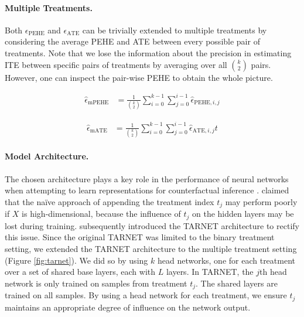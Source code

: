 \documentclass{article}
\begin{document}
\paragraph{Multiple Treatments.} Both $\epsilon_\text{PEHE}$ and $\epsilon_\text{ATE}$ can be trivially extended to multiple treatments by considering the average PEHE and ATE between every possible pair of treatments. Note that we lose the information about the precision in estimating ITE between specific pairs of treatments by averaging over all ${k \choose 2}$ pairs. However, one can inspect the pair-wise PEHE to obtain the whole picture.
\noindent\begin{minipage}{.5\linewidth}
\begin{small}
\begin{align}
\label{eq:multi_PEHE} \hat\epsilon_\text{mPEHE} &= \frac{1}{{k \choose 2}}\sum_{i=0}^{k-1}\sum_{j=0}^{i-1} \hat\epsilon_{\text{PEHE},i,j}
\end{align}
\end{small}
\end{minipage}%
\begin{minipage}{.5\linewidth}
\begin{small}
\begin{align}
\label{eq:multi_ATE} \hat\epsilon_\text{mATE} &= \frac{1}{{k \choose 2}}\sum_{i=0}^{k-1}\sum_{j=0}^{i-1} \hat\epsilon_{\text{ATE},i,j}t
\end{align}
\end{small}
\end{minipage}


\paragraph{Model Architecture.} The chosen architecture plays a key role in the performance of neural networks when attempting to learn representations for counterfactual inference \cite{shalit2016estimating,alaa2018limits}. \citet{shalit2016estimating} claimed that the na\"ive approach of appending the treatment index $t_j$ may perform poorly if $X$ is high-dimensional, because the influence of $t_j$ on the hidden layers may be lost during training. \citet{shalit2016estimating} subsequently introduced the TARNET architecture to rectify this issue. Since the original TARNET was limited to the binary treatment setting, we extended the TARNET architecture to the multiple treatment setting (Figure \ref{fig:tarnet}). We did so by using $k$ head networks, one for each treatment over a set of shared base layers, each with $L$ layers. In TARNET, the $j$th head network is only trained on samples from treatment $t_j$. The shared layers are trained on all samples. By using a head network for each treatment, we ensure $t_j$ maintains an appropriate degree of influence on the network output.
\end{document}
